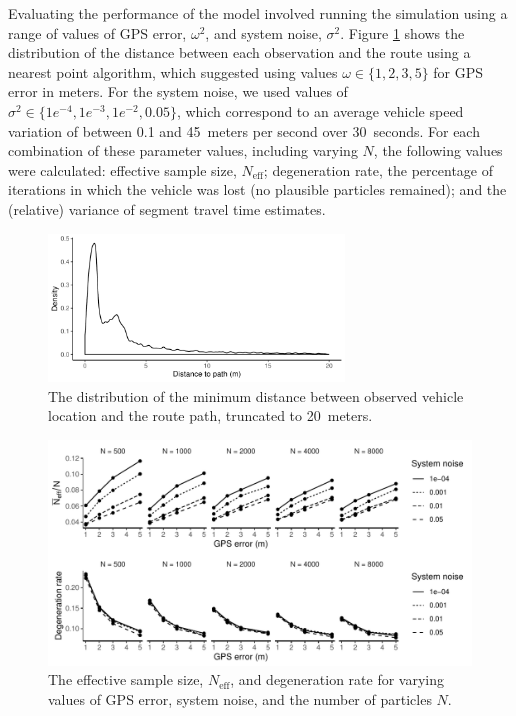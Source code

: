\documentclass[times, doublespace]{anzsauth}
\begin{document}
Evaluating the performance of the model involved
running the simulation using a range of values of GPS error, $\omega^2$,
and system noise, $\sigma^2$.
Figure \ref{fig:dist_to_route} shows the distribution of the distance
between each observation and the route using a nearest point algorithm,
which suggested using values $\omega \in \{1,2,3,5\}$ for GPS error in meters.
For the system noise, we used values of $\sigma^2\in \{1e^{-4},1e^{-3},1e^{-2},0.05\}$,
which correspond to an average vehicle speed variation of between 0.1 and 45~meters per second
over 30~seconds.
For each combination of these parameter values, including varying $N$,
the following values were calculated:
effective sample size, $N_\text{eff}$;
degeneration rate, the percentage of iterations in which the vehicle was lost
(no plausible particles remained);
and the (relative) variance of segment travel time estimates.


\begin{figure}[tb]
    \centering
    \includegraphics[width=0.7\textwidth]{figures/04_model_results_dist.pdf}
    \caption{
        The distribution of the minimum distance between observed vehicle location
        and the route path, truncated to 20~meters.
    }
    \label{fig:dist_to_route}
\end{figure}


\begin{figure}[tb]
    \centering
    \includegraphics[width=\textwidth]{figures/04_model_results_neff.pdf}
    \caption{
        The effective sample size, $N_\text{eff}$,
        and degeneration rate for varying values of GPS error,
        system noise, and the number of particles $N$.
    }
    \label{fig:perf_stats}
\end{figure}
\end{document}
